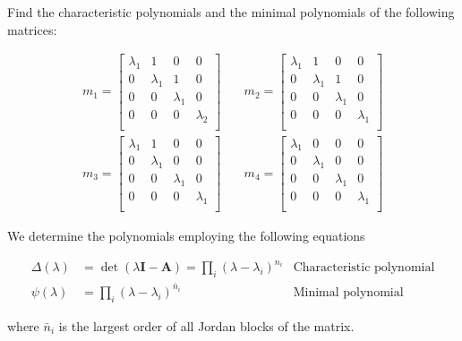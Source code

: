 \item[3.18] Find the characteristic polynomials and the minimal polynomials of the following matrices:

\begin{align*}
 m_1 = \begin{bmatrix}
  \lambda_1 & 1 & 0 & 0\\
  0 &\lambda_1 & 1 & 0 \\
   0 & 0& \lambda_1  & 0\\
  0 & 0 & 0 &\lambda_2 \\
 \end{bmatrix}
& \quad
m_2 = \begin{bmatrix}
  \lambda_1 & 1 & 0 & 0\\
  0 &\lambda_1 & 1 & 0 \\
   0 & 0& \lambda_1  & 0\\
  0 & 0 & 0 &\lambda_1 \\
 \end{bmatrix}
\\
m_3 = \begin{bmatrix}
  \lambda_1 & 1 & 0 & 0\\
  0 &\lambda_1 & 0 & 0 \\
   0 & 0& \lambda_1  & 0\\
  0 & 0 & 0 &\lambda_1 \\
 \end{bmatrix}
& \quad
m_4 = \begin{bmatrix}
  \lambda_1 & 0 & 0 & 0\\
  0 &\lambda_1 & 0 & 0 \\
   0 & 0& \lambda_1  & 0\\
  0 & 0 & 0 &\lambda_1 \\
 \end{bmatrix}
\end{align*}

We determine the polynomials employing the following equations

\begin{align*}
 \Delta(\lambda) &= \det(\lambda \mathbf{I}- \mathbf{A}) = \prod_i (\lambda-\lambda_i)^{n_i}
 & \text{Characteristic polynomial}\\
 \psi(\lambda) &= \prod_i (\lambda-\lambda_i)^{\bar{n}_i} \quad
 & \text{Minimal polynomial}
\end{align*}

where $\bar{n}_i$ is the largest order of all Jordan blocks of the matrix.

